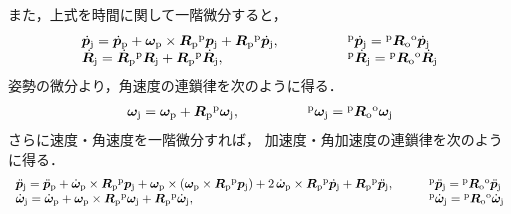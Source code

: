 ﻿\documentclass[a4paper]{jsarticle}
\begin{document}
また，上式を時間に関して一階微分すると，
\begin{align*}
\begin{array}{l@{\hskip5em}l}
\dot{\bm{p}}_{\mathrm{j}}=\dot{\bm{p}}_{\mathrm{p}}
 +\bm{\omega}_{\mathrm{p}}\times\bm{R}_{\mathrm{p}}{}^{\mathrm{p}}\bm{p}_{\mathrm{j}}
 +\bm{R}_{\mathrm{p}}{}^{\mathrm{p}}\dot{\bm{p}}_{\mathrm{j}}, &
{}^{\mathrm{p}}\dot{\bm{p}}_{\mathrm{j}}={}^{\mathrm{p}}\bm{R}_{\mathrm{o}}{}^{\mathrm{o}}\dot{\bm{p}}_{\mathrm{j}} \\
\dot{\bm{R}}_{\mathrm{j}}=\dot{\bm{R}}_{\mathrm{p}}{}^{\mathrm{p}}\bm{R}_{\mathrm{j}}
 +\bm{R}_{\mathrm{p}}{}^{\mathrm{p}}\dot{\bm{R}}_{\mathrm{j}}, &
{}^{\mathrm{p}}\dot{\bm{R}}_{\mathrm{j}}={}^{\mathrm{p}}\bm{R}_{\mathrm{o}}{}^{\mathrm{o}}\dot{\bm{R}}_{\mathrm{j}} \\
\end{array}
\end{align*}
姿勢の微分より，角速度の連鎖律を次のように得る．
\begin{align*}
\begin{array}{l@{\hskip5em}l}
\bm{\omega}_{\mathrm{j}}=\bm{\omega}_{\mathrm{p}}+\bm{R}_{\mathrm{p}}{}^{\mathrm{p}}\bm{\omega}_{\mathrm{j}}, &
{}^{\mathrm{p}}\bm{\omega}_{\mathrm{j}}={}^{\mathrm{p}}\bm{R}_{\mathrm{o}}{}^{\mathrm{o}}\bm{\omega}_{\mathrm{j}}
\end{array}
\end{align*}
さらに速度・角速度を一階微分すれば，
加速度・角加速度の連鎖律を次のように得る．
\begin{align*}
\begin{array}{l@{\hskip3em}l}
\ddot{\bm{p}}_{\mathrm{j}}=\ddot{\bm{p}}_{\mathrm{p}}
 +\dot{\bm{\omega}}_{\mathrm{p}}\times\bm{R}_{\mathrm{p}}{}^{\mathrm{p}}\bm{p}_{\mathrm{j}}
 +\bm{\omega}_{\mathrm{p}}\times(\bm{\omega}_{\mathrm{p}}\times\bm{R}_{\mathrm{p}}{}^{\mathrm{p}}\bm{p}_{\mathrm{j}})
 +2\,\dot{\bm{\omega}}_{\mathrm{p}}\times\bm{R}_{\mathrm{p}}{}^{\mathrm{p}}\dot{\bm{p}}_{\mathrm{j}}
 +\bm{R}_{\mathrm{p}}{}^{\mathrm{p}}\ddot{\bm{p}}_{\mathrm{j}}, &
{}^{\mathrm{p}}\ddot{\bm{p}}_{\mathrm{j}}={}^{\mathrm{p}}\bm{R}_{\mathrm{o}}{}^{\mathrm{o}}\ddot{\bm{p}}_{\mathrm{j}}
 \\
\dot{\bm{\omega}}_{\mathrm{j}}=\dot{\bm{\omega}}_{\mathrm{p}}
+\bm{\omega}_{\mathrm{p}}\times\bm{R}_{\mathrm{p}}{}^{\mathrm{p}}\bm{\omega}_{\mathrm{j}}
+\bm{R}_{\mathrm{p}}{}^{\mathrm{p}}\dot{\bm{\omega}}_{\mathrm{j}}, &
{}^{\mathrm{p}}\dot{\bm{\omega}}_{\mathrm{j}}={}^{\mathrm{p}}\bm{R}_{\mathrm{o}}{}^{\mathrm{o}}\dot{\bm{\omega}}_{\mathrm{j}}
\end{array}
\end{align*}
\end{document}
